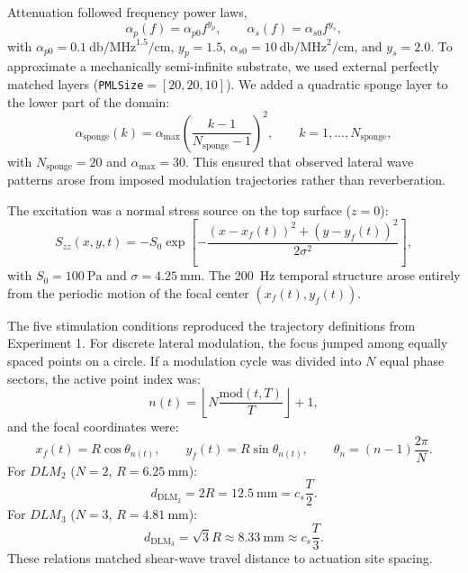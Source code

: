 \documentclass[pdflatex, sn-nature]{sn-jnl}
\theoremstyle{thmstyleone}%
\theoremstyle{thmstyletwo}%
\theoremstyle{thmstylethree}%
\begin{document}
Attenuation followed frequency power laws,
\begin{equation}
    \alpha_p(f) = \alpha_{p0} f^{y_p},
    \qquad
    \alpha_s(f) = \alpha_{s0} f^{y_s},
\end{equation}
with $\alpha_{p0}=\qty{0.1}{\decibel\per\mega\hertz\tothe{1.5}\per\centi\meter}$, $y_p=1.5$, $\alpha_{s0}=\qty{10}{\decibel\per\mega\hertz\squared\per\centi\meter}$, and $y_s=2.0$. To approximate a mechanically semi-infinite substrate, we used external perfectly matched layers (\texttt{PMLSize}$=[20,20,10]$). We added a quadratic sponge layer to the lower part of the domain:
\begin{equation}
    \alpha_{\mathrm{sponge}}(k)=\alpha_{\max}\left(\frac{k-1}{N_{\mathrm{sponge}}-1}\right)^2,
    \qquad k=1,\dots,N_{\mathrm{sponge}},
\end{equation}
with $N_{\mathrm{sponge}}=20$ and $\alpha_{\max}=30$. This ensured that observed lateral wave patterns arose from imposed modulation trajectories rather than reverberation.

The excitation was a normal stress source on the top surface ($z=0$):
\begin{equation}
    S_{zz}(x,y,t) = -S_0 \exp\!\left[-\frac{(x-x_f(t))^2+(y-y_f(t))^2}{2\sigma^2}\right],
\end{equation}
with $S_0=\qty{100}{\pascal}$ and $\sigma=\qty{4.25}{\milli\meter}$. The \qty{200}{\hertz} temporal structure arose entirely from the periodic motion of the focal center $(x_f(t),y_f(t))$.

The five stimulation conditions reproduced the trajectory definitions from Experiment 1. For discrete lateral modulation, the focus jumped among equally spaced points on a circle. If a modulation cycle was divided into $N$ equal phase sectors, the active point index was:
\begin{equation}
    n(t)=\left\lfloor N\frac{\mathrm{mod}(t,T)}{T}\right\rfloor+1,
\end{equation}
and the focal coordinates were:
\begin{equation}
    x_f(t)=R\cos\theta_{n(t)},
    \qquad
    y_f(t)=R\sin\theta_{n(t)},
    \qquad
    \theta_n = (n-1)\frac{2\pi}{N}.
\end{equation}
For $DLM_2$ ($N=2$, $R=\qty{6.25}{\milli\meter}$):
\begin{equation}
    d_{\mathrm{DLM_2}} = 2R = \qty{12.5}{\milli\meter} = c_s\frac{T}{2}.
\end{equation}
For $DLM_3$ ($N=3$, $R=\qty{4.81}{\milli\meter}$):
\begin{equation}
    d_{\mathrm{DLM_3}} = \sqrt{3}R \approx \qty{8.33}{\milli\meter} \approx c_s\frac{T}{3}.
\end{equation}
These relations matched shear-wave travel distance to actuation site spacing.
\end{document}

